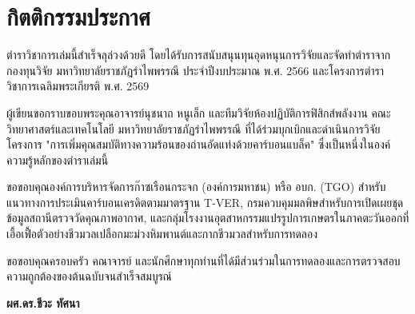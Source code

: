 \chapter*{กิตติกรรมประกาศ}

ตำราวิชาการเล่มนี้สำเร็จลุล่วงด้วยดี โดยได้รับการสนับสนุนทุนอุดหนุนการวิจัยและจัดทำตำราจากกองทุนวิจัย มหาวิทยาลัยราชภัฏรำไพพรรณี ประจำปีงบประมาณ พ.ศ. 2566 และโครงการตำราวิชาการเฉลิมพระเกียรติ พ.ศ. 2569

ผู้เขียนขอกราบขอบพระคุณอาจารย์นุชนาถ หนูเล็ก และทีมวิจัยห้องปฏิบัติการฟิสิกส์พลังงาน คณะวิทยาศาสตร์และเทคโนโลยี มหาวิทยาลัยราชภัฏรำไพพรรณี ที่ได้ร่วมบุกเบิกและดำเนินการวิจัยโครงการ "การเพิ่มคุณสมบัติทางความร้อนของถ่านอัดแท่งด้วยคาร์บอนแบล็ค" ซึ่งเป็นหนึ่งในองค์ความรู้หลักของตำราเล่มนี้

ขอขอบคุณองค์การบริหารจัดการก๊าซเรือนกระจก (องค์การมหาชน) หรือ อบก. (TGO) สำหรับแนวทางการประเมินคาร์บอนเครดิตตามมาตรฐาน T-VER, กรมควบคุมมลพิษสำหรับการเปิดเผยชุดข้อมูลสถานีตรวจวัดคุณภาพอากาศ, และกลุ่มโรงงานอุตสาหกรรมแปรรูปการเกษตรในภาคตะวันออกที่เอื้อเฟื้อตัวอย่างชีวมวลเปลือกมะม่วงหิมพานต์และกากชีวมวลสำหรับการทดลอง

ขอขอบคุณครอบครัว คณาจารย์ และนักศึกษาทุกท่านที่ได้มีส่วนร่วมในการทดลองและการตรวจสอบความถูกต้องของต้นฉบับจนสำเร็จสมบูรณ์

\vspace{1.5cm}
\begin{flushright}
    \textbf{ผศ.ดร.ชีวะ ทัศนา}
\end{flushright}
